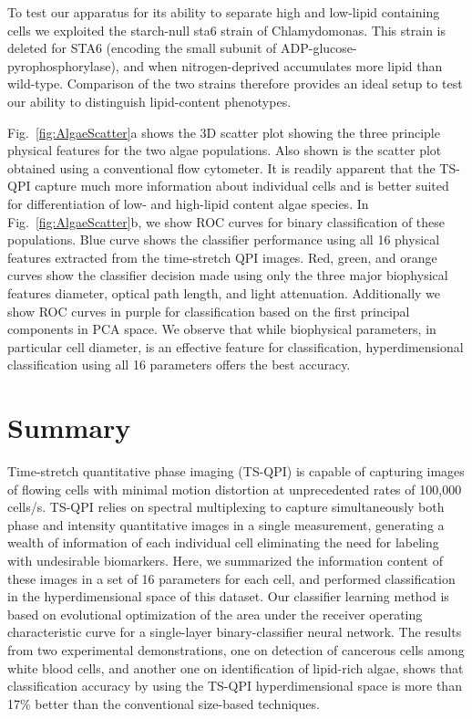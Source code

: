 \documentclass[aps,pra,preprint,superscriptaddress]{revtex4-1}
\begin{document}
To test our apparatus for its ability to separate high and low-lipid containing cells we exploited the starch-null sta6 strain of Chlamydomonas. This strain is deleted for STA6 (encoding the small subunit of ADP-glucose-pyrophosphorylase), and when nitrogen-deprived accumulates more lipid than wild-type. Comparison of the two strains therefore provides an ideal setup to test our ability to distinguish lipid-content phenotypes.

Fig.~\ref{fig:AlgaeScatter}a shows the 3D scatter plot showing the three principle physical features for the two algae populations. Also shown is the scatter plot obtained using a conventional flow cytometer. It is readily apparent that the TS-QPI capture much more information about individual cells and is better suited for differentiation of low- and high-lipid content algae species. In Fig.~\ref{fig:AlgaeScatter}b, we show ROC curves for binary classification of these populations. Blue curve shows the classifier performance using all 16 physical features extracted from the time-stretch QPI images. Red, green, and orange curves show the classifier decision made using only the three major biophysical features diameter, optical path length, and light attenuation. Additionally we show ROC curves in purple for classification based on the first principal components in PCA space. We observe that while biophysical parameters, in particular cell diameter, is an effective feature for classification, hyperdimensional classification using all 16 parameters offers the best accuracy. 


\section{Summary}

Time-stretch quantitative phase imaging (TS-QPI) is capable of capturing images of flowing cells with minimal motion distortion at unprecedented rates of 100,000 cells/s. TS-QPI relies on spectral multiplexing to capture simultaneously both phase and intensity quantitative images in a single measurement, generating a wealth of information of each individual cell eliminating the need for labeling with undesirable biomarkers. Here, we summarized the information content of these images in a set of 16 parameters for each cell, and performed classification in the hyperdimensional space of this dataset. Our classifier learning method is based on evolutional optimization of the area under the receiver operating characteristic curve for a single-layer binary-classifier neural network. The results from two experimental demonstrations, one on detection of cancerous cells among white blood cells, and another one on identification of lipid-rich algae, shows that classification accuracy by using the TS-QPI hyperdimensional space is more than 17\% better than the conventional size-based techniques.
\end{document}
